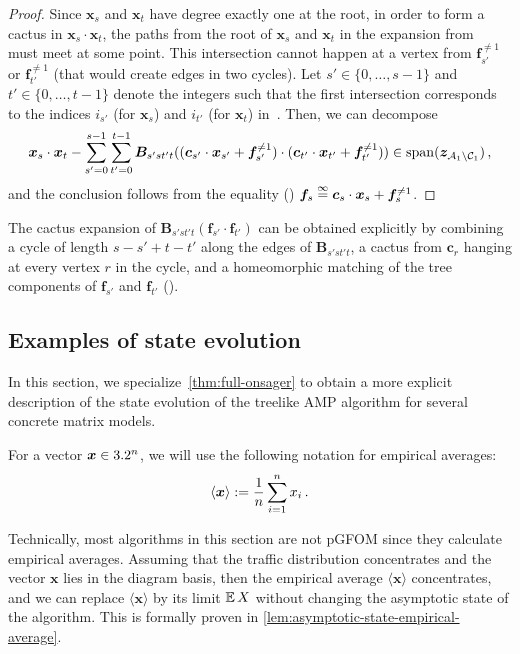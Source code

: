 \begin{proof}
    Since $\bm x_s$ and $\bm x_t$ have
    degree exactly one at the root, in
    order to form a cactus in $\bm x_s\cdot \bm x_t$, the paths
    from the root of $\bm x_s$ and $\bm x_t$ in the expansion from~ must meet at some point. This
    intersection
    cannot happen at a vertex from $\bm f_{s'}^{\neq 1}$ or $\bm f_{t'}^{\neq 1}$ (that would create edges in two cycles).
    Let
    $s'\in \{0,\ldots,s-1\}$ and $t'\in \{0,\ldots,t-1\}$ denote the integers
    such that the first intersection
    corresponds to the indices
    $i_{s'}$ (for $\bm x_s$) and $i_{t'}$ (for $\bm x_t$) in~. Then,
    we can decompose
    \[
        \bm x_s\cdot \bm x_t - \sum_{s'=0}^{s-1} \sum_{t'=0}^{t-1} \bm B_{s'st't} ((\bm c_{s'} \cdot \bm x_{s'} + \bm f_{s'}^{\neq 1}) \cdot (\bm c_{t'} \cdot \bm x_{t'} + \bm f_{t'}^{\neq 1}))\in \operatorname{span}(\bm z_{{\cal A}_1\setminus {\cal C}_1})\,,
    \]
    and the conclusion follows from
    the equality () $\bm f_s\overset{\infty}{=} \bm c_s \cdot \bm x_s + \bm f_s^{\neq 1}$.
\end{proof}

\noindent The 
cactus expansion of $\bm B_{s'st't} (\bm f_{s'} \cdot \bm f_{t'})$ can be obtained explicitly by
combining a cycle of length $s-s'+t-t'$
along the edges of $\bm B_{s'st't}$,
a cactus from $\bm c_r$ hanging at every vertex $r$ in the cycle, and a homeomorphic
matching of the tree components of $\bm f_{s'}$ and $\bm f_{t'}$ (). 

\subsection{Examples of state evolution}\label{sec:se-examples}

In this section, we specialize~\cref{thm:full-onsager}
to obtain a more explicit description
of the state evolution of the
treelike AMP algorithm for several concrete matrix models. 

\begin{notation}
    \label{not:empirical}
    For a vector $\bm x\in 3.2^n$, we will use the following notation for empirical averages:
    \[
        \langle \bm x \rangle := \frac 1n \sum_{i=1}^n x_i\,.
    \]
\end{notation}

Technically, most algorithms in this section are not pGFOM since they
calculate empirical averages.
Assuming that the traffic distribution concentrates and the vector $\bm x$ lies in the diagram basis,
then the empirical average $\langle{\bm x}\rangle$ concentrates,
and we can replace $\langle{\bm x}\rangle$ by its limit $\operatorname*{\mathbb{E}} X$ without changing the asymptotic state of the algorithm.
This is formally proven in \cref{lem:asymptotic-state-empirical-average}.


